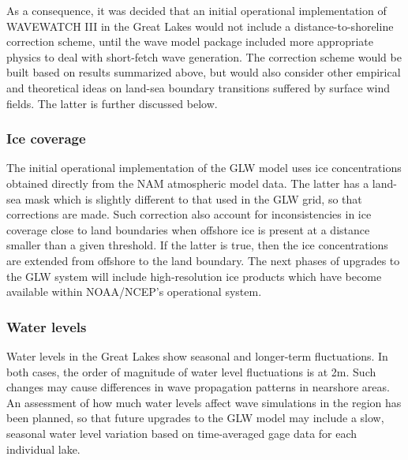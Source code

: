 As a consequence, it was decided that an initial operational implementation of
WAVEWATCH III in the Great Lakes would not include a distance-to-shoreline
correction scheme, until the wave model package included more appropriate
physics to deal with short-fetch wave generation. The correction scheme would be
built based on results summarized above, but would also consider other empirical
and theoretical ideas on land-sea boundary transitions suffered by surface wind
fields. The latter is further discussed below.

\subsubsection{Ice coverage}

The initial operational implementation of the GLW model uses ice concentrations
obtained directly from the NAM atmospheric model data. The latter has a land-sea
mask which is slightly different to that used in the GLW grid, so that
corrections are made. Such correction also account for inconsistencies in ice
coverage close to land boundaries when offshore ice is present at a distance
smaller than a given threshold. If the latter is true, then the ice
concentrations are extended from offshore to the land boundary. The next phases
of upgrades to the GLW system will include high-resolution ice products which
have become available within NOAA/NCEP's operational system.

\subsubsection{Water levels}

Water levels in the Great Lakes show seasonal and longer-term fluctuations. In
both cases, the order of magnitude of water level fluctuations is at 2m. Such
changes may cause differences in wave propagation patterns in nearshore areas.
An assessment of how much water levels affect wave simulations in the region has
been planned, so that future upgrades to the GLW model may include a slow,
seasonal water level variation based on time-averaged gage data for each
individual lake.

